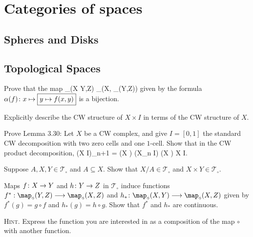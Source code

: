 \chapter{Categories of spaces}

\section{Spheres and Disks}



\section{Topological Spaces}

\bp
Prove that the map
\bse
\alpha \cl \mor_{}(X \times Y,Z) \longrightarrow \mor_{}(X, \mor_{}(Y,Z))
\ese
given by the formula $\alpha(f) \colon x\mapsto \boxed{y\mapsto f(x, y)}$ is a bijection.
\ep

\bs
\es

\addtocounter{exercise}{1}
\bp
\ben[label=(\alph*)]
\item Explicitly describe the CW structure of $X \times I$ in terms of the CW structure of $X$.
\item Prove Lemma 3.30: Let $X$ be a CW complex, and give $I = [0, 1]$ the standard CW decomposition with two zero cells and one $1$-cell. Show that in the CW product decomposition,
\bse
(X \times I)_{n+1} = (X ) \cup (X_n \times I) \cup (X ) \subseteq X \times I.
\ese
\een
\ep

\bs
\ben[label=(\alph*)]
\item 
\item 
\een
\es


\bp
Suppose $A,X, Y \in \mathcal{T}_{\circ}$ and $A \subseteq X$. Show that $X/A \in \mathcal{T}_{\circ}$ and $X \times Y \in \mathcal{T}_{\circ}$.
\ep

\bs
\es

\bp
Maps $f \colon X \to Y$ and $h \colon Y \to Z$ in $\mathcal{T}_{\circ}$ induce functions $f^*: \map_{\circ}(Y,Z) \longrightarrow \map_{\circ}(X,Z)$ and $h_* \cl \map_{\circ}(X, Y ) \longrightarrow \map_{\circ}(X,Z)$ given by $f^*(g) = g\circ f$ and $h_*(g) = h\circ g$. Show that $f^*$ and $h_*$ are continuous.

{\scshape Hint}. Express the function you are interested in as a composition of the map $\circ$ with another function.
\ep

\bs
\es

































